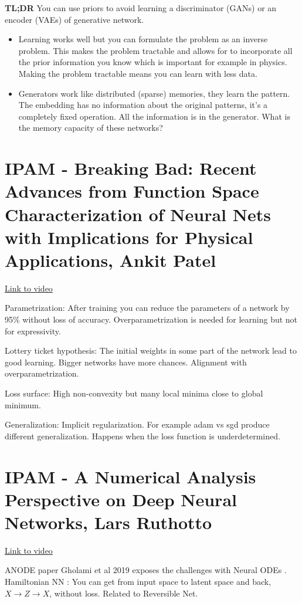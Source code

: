 \documentclass{article}
\begin{document}
\textbf{TL;DR} You can use priors to avoid learning a discriminator (GANs) or an encoder (VAEs) of generative network. 

\begin{itemize}
    \item Learning works well but you can formulate the problem as an inverse problem. This makes the problem tractable and allows for to incorporate all the prior information you know which is important for example in physics. Making the problem tractable means you can learn with less data.
\item Generators work like distributed (sparse) memories, they learn the pattern. The embedding has no information about the original patterns, it's a completely fixed operation. All the information is in the generator. What is the memory capacity of these networks?
\end{itemize}

\section{IPAM - Breaking Bad: Recent Advances from Function Space Characterization of Neural Nets with Implications for Physical Applications, Ankit Patel}

\href{http://www.ipam.ucla.edu/abstract/?tid=15765&pcode=MLPWS1}{Link to video}


Parametrization: After training you can reduce the parameters of a network by 95\% without loss of accuracy. Overparametrization is needed for learning but not for expressivity.

Lottery ticket hypothesis: The initial weights in some part of the network lead to good learning. Bigger networks have more chances. Alignment with overparametrization.  

Loss surface: High non-convexity but many local minima close to global minimum.

Generalization: Implicit regularization. For example adam vs sgd produce different generalization. Happens when the loss function is underdetermined.


\section{IPAM - A Numerical Analysis Perspective on Deep Neural Networks, Lars Ruthotto}
\href{http://www.ipam.ucla.edu/abstract/?tid=16362&pcode=MLPWS1}{Link to video}

ANODE paper Gholami et al 2019 exposes the challenges with Neural ODEs \parencite{Chen2018NeuralEquations}. Hamiltonian NN \parencite{Ruthotto2019DeepEquations}: You can get from input space to latent space and back, $X\rightarrow Z \rightarrow X$, without loss. Related to Reversible Net. 
\end{document}

